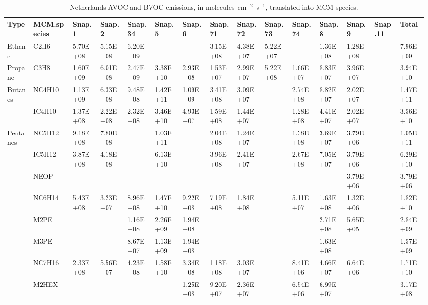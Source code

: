 \tiny
\begin{longtable}{lllllllllllllll}
	\caption{Netherlands AVOC and BVOC emissions, in molecules~cm$^{-2}$~s$^{-1}$, translated into MCM species.}\\%
	\hline \hline
	\textbf{Type} & \textbf{MCM.species} & \textbf{Snap.1} & \textbf{Snap.2} & \textbf{Snap.34} & \textbf{Snap.5} & \textbf{Snap.6} & \textbf{Snap.71} & \textbf{Snap.72} & \textbf{Snap.73} & \textbf{Snap.74} & \textbf{Snap.8} & \textbf{Snap.9} & \textbf{Snap.11} & \textbf{Total}\\
	\endhead
	\hline
	Ethane & C2H6 & 5.70E+08 & 5.15E+08 & 6.20E+09 &  &  & 3.15E+08 & 4.38E+07 & 5.22E+07 &  & 1.36E+08 & 1.28E+08 &  & 7.96E+09 \\
	\hline Propane & C3H8 & 1.60E+09 & 6.01E+08 & 2.47E+09 & 3.38E+10 & 2.93E+08 & 1.53E+07 & 2.99E+07 & 5.22E+08 & 1.66E+07 & 8.83E+07 & 3.96E+07 &  & 3.94E+10 \\ \hline
	\multirow{2}{*}{Butanes} & NC4H10 & 1.13E+09 & 6.33E+08 & 9.48E+08 & 1.42E+11 & 1.09E+09 & 3.41E+08 & 3.09E+07 &  & 2.74E+08 & 8.82E+07 & 2.02E+07 &  & 1.47E+11 \\
	 & IC4H10 & 1.37E+08 & 2.22E+08 & 2.32E+08 & 3.46E+10 & 4.93E+07 & 1.59E+08 & 1.44E+07 &  & 1.28E+08 & 4.41E+07 & 2.02E+07 &  & 3.56E+10 \\
	\hline \multirow{3}{*}{Pentanes} & NC5H12 & 9.18E+08 & 7.80E+08 &  & 1.03E+11 &  & 2.04E+08 & 1.24E+07 &  & 1.38E+08 & 3.69E+07 & 3.79E+06 &  & 1.05E+11 \\
	 & IC5H12 & 3.87E+08 & 4.18E+08 &  & 6.13E+10 &  & 3.96E+08 & 2.41E+07 &  & 2.67E+08 & 7.05E+07 & 3.79E+06 &  & 6.29E+10 \\
	 & NEOP &  &  &  &  &  &  &  &  &  &  & 3.79E+06 &  & 3.79E+06 \\
	\hline \parbox[t]{2mm}{} & NC6H14 & 5.43E+08 & 3.23E+07 & 8.96E+08 & 1.47E+10 & 9.22E+08 & 7.19E+08 & 1.84E+08 &  & 5.11E+07 & 1.63E+08 & 1.32E+06 &  & 1.82E+10 \\
	 & M2PE &  &  & 1.16E+08 & 2.26E+09 & 1.94E+08 &  &  &  &  & 2.71E+08 & 5.65E+05 &  & 2.84E+09 \\
	 & M3PE &  &  & 8.67E+07 & 1.13E+09 & 1.94E+08 &  &  &  &  & 1.63E+08 &  &  & 1.57E+09 \\
	 & NC7H16 & 2.33E+08 & 5.56E+07 & 4.23E+08 & 1.58E+10 & 3.34E+08 & 1.18E+08 & 3.03E+07 &  & 8.41E+06 & 4.66E+07 & 6.64E+06 &  & 1.71E+10 \\
	 & M2HEX &  &  &  &  & 1.25E+08 & 9.20E+07 & 2.36E+07 &  & 6.54E+06 & 6.99E+07 &  &  & 3.17E+08 \\

\end{longtable}
